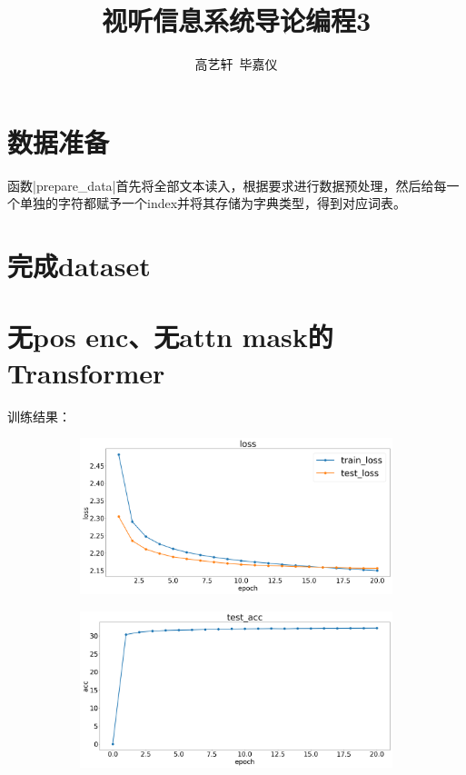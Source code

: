 \documentclass[11pt, a4paper]{article}
\title{\Large{\bf{视听信息系统导论编程3}}}
\author{高艺轩\ 毕嘉仪}
\date{}
\begin{document}
\maketitle
\section{数据准备}
函数|prepare_data|首先将全部文本读入，根据要求进行数据预处理，然后给每一个单独的字符都赋予一个index并将其存储为字典类型，得到对应词表。

\section{完成dataset}

\section{无pos enc、无attn mask的Transformer}
训练结果：\begin{figure}[H]
    \hfill
    \begin{subfigure}[t]{0.45\linewidth}
        \includegraphics[width=\textwidth]{img/3-1.png}
    \end{subfigure}
    \hfill
    \begin{subfigure}[t]{0.45\linewidth}
        \includegraphics[width=\textwidth]{img/3-2.png}
    \end{subfigure}
    \hfill
\end{figure}
\end{document}
